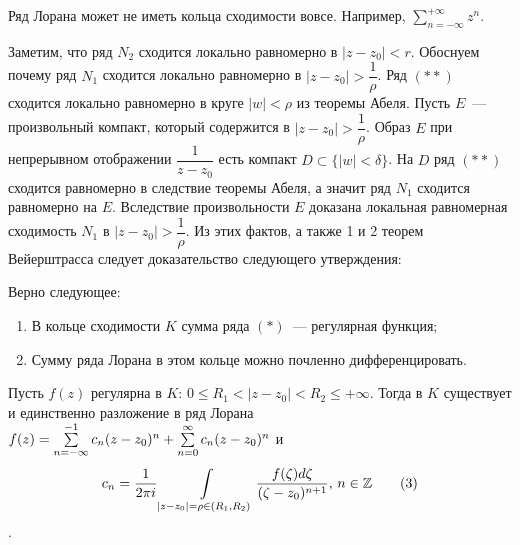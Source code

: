\begin{example}
    Ряд Лорана может не иметь кольца сходимости вовсе. Например, \(\sum\limits_{n = -\infty}^
    {+\infty} z^n\).
\end{example}

Заметим, что ряд \(N_2\) сходится локально равномерно в \(|z-z_0| < r\). Обоснуем почему ряд
\(N_1\) сходится локально равномерно в \(|z-z_0| > \dfrac{1}{\rho}\). Ряд \((**)\) сходится локально
равномерно в круге \(|w| < \rho\) из теоремы Абеля. Пусть \(E\)~--- произвольный компакт, который
содержится в \(|z-z_0| > \dfrac{1}{\rho}\). Образ \(E\) при непрерывном отображении \(\dfrac{1}
{z-z_0}\) есть компакт \(D \subset \{|w|<\delta\}\). На \(D\) ряд \((**)\) сходится равномерно
в следствие теоремы Абеля, а значит ряд \(N_1\) сходится равномерно на \(E\). Вследствие
произвольности \(E\) доказана локальная равномерная сходимость \(N_1\) в \(|z-z_0| > \dfrac{1}
{\rho}\). Из этих фактов, а также 1 и 2 теорем Вейерштрасса следует доказательство следующего
утверждения:

\begin{statement}
    Верно следующее:
    \begin{enumerate}[wide=20pt, label=\arabic*., itemsep=0ex]
        \item В кольце сходимости \(K\) сумма ряда \((*)\)~--- регулярная функция;
        \item Сумму ряда Лорана в этом кольце можно почленно дифференцировать.
    \end{enumerate}
\end{statement}

\begin{statement}
    Пусть \(f(z)\) регулярна в \(K\colon \, 0 \le R_1 < |z-z_0|< R_2 \le +\infty\). Тогда в \(K\)
    существует и единственно разложение в ряд Лорана \(f(z) = \sum\limits_{n = -\infty}^{-1} c_n
    (z-z_0)^n + \sum\limits_{n=0}^{\infty} c_n (z\hm-z_0)^n\) и \[c_n = \dfrac{1}{2 \pi i}
    \int\limits_{|z - z_0| = \rho \in (R_1, R_2)} \dfrac{f(\zeta) d\zeta}{(\zeta - z_0) ^ {n+1}}, \,
    n \in \mathbb{Z} \tag{3}\].
\end{statement}

